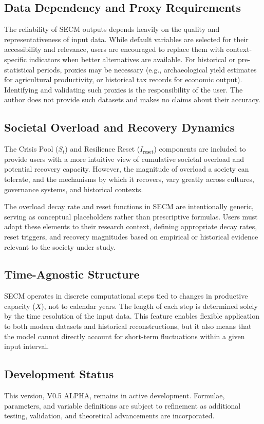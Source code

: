 \documentclass[12pt,a4paper]{article}
\begin{document}
\subsection{Data Dependency and Proxy Requirements}
The reliability of SECM outputs depends heavily on the quality and representativeness of input data. While default variables are selected for their accessibility and relevance, users are encouraged to replace them with context-specific indicators when better alternatives are available.  
For historical or pre-statistical periods, proxies may be necessary (e.g., archaeological yield estimates for agricultural productivity, or historical tax records for economic output). Identifying and validating such proxies is the responsibility of the user. The author does not provide such datasets and makes no claims about their accuracy.

\subsection{Societal Overload and Recovery Dynamics}
The Crisis Pool ($S_t$) and Resilience Reset ($I_{\mathrm{reset}}$) components are included to provide users with a more intuitive view of cumulative societal overload and potential recovery capacity. However, the magnitude of overload a society can tolerate, and the mechanisms by which it recovers, vary greatly across cultures, governance systems, and historical contexts.

The overload decay rate and reset functions in SECM are intentionally generic, serving as conceptual placeholders rather than prescriptive formulas. Users must adapt these elements to their research context, defining appropriate decay rates, reset triggers, and recovery magnitudes based on empirical or historical evidence relevant to the society under study.

\subsection{Time-Agnostic Structure}
SECM operates in discrete computational steps tied to changes in productive capacity ($X$), not to calendar years. The length of each step is determined solely by the time resolution of the input data. This feature enables flexible application to both modern datasets and historical reconstructions, but it also means that the model cannot directly account for short-term fluctuations within a given input interval.

\subsection{Development Status}
This version, V0.5 ALPHA, remains in active development. Formulae, parameters, and variable definitions are subject to refinement as additional testing, validation, and theoretical advancements are incorporated.
\end{document}
